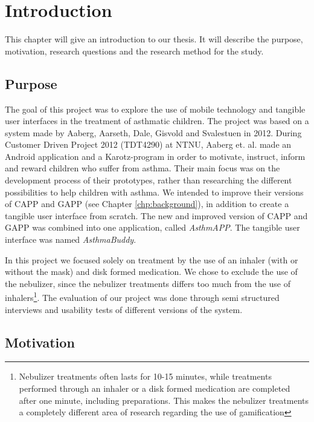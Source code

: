 \chapter{Introduction}
\label{chp:introduction}

This chapter will give an introduction to our thesis. It will describe the purpose, motivation, research questions and the research method for the study. 

\section{Purpose}
\label{sec:purpose}
The goal of this project was to explore the use of mobile technology and tangible user interfaces in the treatment of asthmatic children. The project was based on a system made by Aaberg, Aarseth, Dale, Gisvold and Svalestuen in 2012\cite{CustomerDriven}. During Customer Driven Project 2012 (TDT4290) at NTNU, Aaberg et. al. made an Android application and a Karotz-program in order to motivate, instruct, inform and reward children who suffer from asthma. Their main focus was on the development process of their prototypes, rather than researching the different possibilities to help children with asthma.
We intended to improve their versions of CAPP and GAPP (see Chapter \ref{chp:background}), in addition to create a tangible user interface from scratch. The new and improved version of CAPP and GAPP was combined into one application, called \emph{AsthmAPP}. The tangible user interface was named \emph{AsthmaBuddy}. 

In this project we focused solely on treatment by the use of an inhaler (with or without the mask) and disk formed medication. We chose to exclude the use of the nebulizer, since the nebulizer treatments differs too much from the use of inhalers\footnote{Nebulizer treatments often lasts for 10-15 minutes, while treatments performed through an inhaler or a disk formed medication are completed after one minute, including preparations. This makes the nebulizer treatments a completely different area of research regarding the use of gamification}.
The evaluation of our project was done through semi structured interviews and usability tests of different versions of the system. 
 

\section{Motivation}
\label{sec:motivation}


